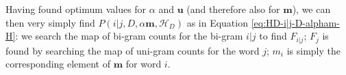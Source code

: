 %
Having found optimum values for $\alpha$ and $\boldsymbol{u}$ (and therefore also for $\boldsymbol{m}$), we can then very simply find $P(i|j,D,\alpha\boldsymbol{m},\mathscr{H}_{D})$ as in Equation \ref{eq:HD-i|j-D-alpham-H}: we search the map of bi-gram counts for the bi-gram $i|j$ to find $F_{i|j}$; $F_{j}$ is found by searching the map of uni-gram counts for the word $j$; $m_{i}$ is simply the corresponding element of $\boldsymbol{m}$ for word $i$.


